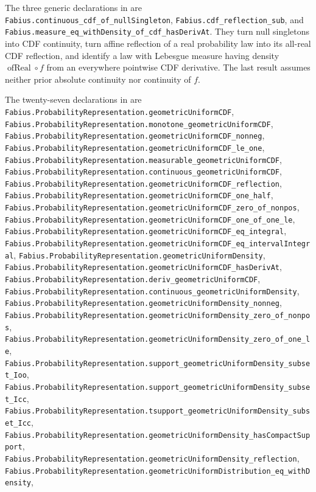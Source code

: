 \documentclass[11pt,oneside]{article}
\theoremstyle{definition}
\theoremstyle{remark}
\newcommand{\1}{\mathbf 1}
\begin{document}
\begin{statusbox}
The three generic declarations in  are
\nolinkurl{Fabius.continuous_cdf_of_nullSingleton},
\nolinkurl{Fabius.cdf_reflection_sub}, and
\nolinkurl{Fabius.measure_eq_withDensity_of_cdf_hasDerivAt}.  They turn null singletons into
CDF continuity, turn affine reflection of a real probability law into its all-real CDF
reflection, and identify a law with Lebesgue measure having density
\(\operatorname{ofReal}\circ f\) from an everywhere pointwise CDF derivative.  The last
result assumes neither prior absolute continuity nor continuity of \(f\).

The twenty-seven declarations in  are
\nolinkurl{Fabius.ProbabilityRepresentation.geometricUniformCDF},
\nolinkurl{Fabius.ProbabilityRepresentation.monotone_geometricUniformCDF},
\nolinkurl{Fabius.ProbabilityRepresentation.geometricUniformCDF_nonneg},
\nolinkurl{Fabius.ProbabilityRepresentation.geometricUniformCDF_le_one},
\nolinkurl{Fabius.ProbabilityRepresentation.measurable_geometricUniformCDF},
\nolinkurl{Fabius.ProbabilityRepresentation.continuous_geometricUniformCDF},
\nolinkurl{Fabius.ProbabilityRepresentation.geometricUniformCDF_reflection},
\nolinkurl{Fabius.ProbabilityRepresentation.geometricUniformCDF_one_half},
\nolinkurl{Fabius.ProbabilityRepresentation.geometricUniformCDF_zero_of_nonpos},
\nolinkurl{Fabius.ProbabilityRepresentation.geometricUniformCDF_one_of_one_le},
\nolinkurl{Fabius.ProbabilityRepresentation.geometricUniformCDF_eq_integral},
\nolinkurl{Fabius.ProbabilityRepresentation.geometricUniformCDF_eq_intervalIntegral},
\nolinkurl{Fabius.ProbabilityRepresentation.geometricUniformDensity},
\nolinkurl{Fabius.ProbabilityRepresentation.geometricUniformCDF_hasDerivAt},
\nolinkurl{Fabius.ProbabilityRepresentation.deriv_geometricUniformCDF},
\nolinkurl{Fabius.ProbabilityRepresentation.continuous_geometricUniformDensity},
\nolinkurl{Fabius.ProbabilityRepresentation.geometricUniformDensity_nonneg},
\nolinkurl{Fabius.ProbabilityRepresentation.geometricUniformDensity_zero_of_nonpos},
\nolinkurl{Fabius.ProbabilityRepresentation.geometricUniformDensity_zero_of_one_le},
\nolinkurl{Fabius.ProbabilityRepresentation.support_geometricUniformDensity_subset_Ioo},
\nolinkurl{Fabius.ProbabilityRepresentation.support_geometricUniformDensity_subset_Icc},
\nolinkurl{Fabius.ProbabilityRepresentation.tsupport_geometricUniformDensity_subset_Icc},
\nolinkurl{Fabius.ProbabilityRepresentation.geometricUniformDensity_hasCompactSupport},
\nolinkurl{Fabius.ProbabilityRepresentation.geometricUniformDensity_reflection},
\nolinkurl{Fabius.ProbabilityRepresentation.geometricUniformDistribution_eq_withDensity},

\end{statusbox}
\end{document}
